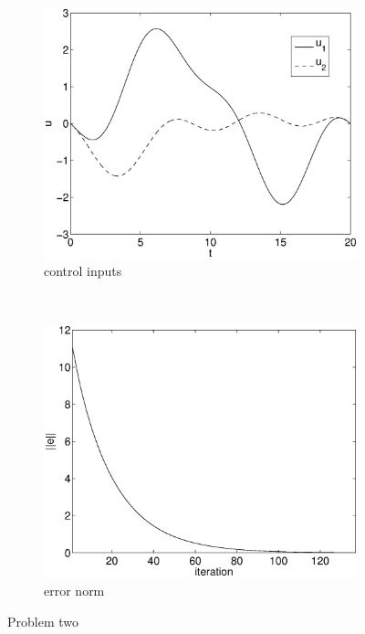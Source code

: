 \begin{figure}
\begin{subfigure}[b]{0.45\textwidth}
\centering
\includegraphics[width=\textwidth]{img/manip_pltf_task_u.eps}
\caption{control inputs}
\end{subfigure}
~
\begin{subfigure}[b]{0.45\textwidth}
\centering
\includegraphics[width=\textwidth]{img/manip_pltf_task_err.eps}
\caption{error norm}
\end{subfigure}
\caption{Problem two}
\label{fig:pr2}
\end{figure}